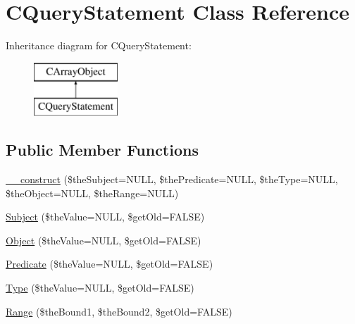 \hypertarget{class_c_query_statement}{\section{C\-Query\-Statement Class Reference}
\label{class_c_query_statement}
}
Inheritance diagram for C\-Query\-Statement\-:\begin{figure}[H]
\begin{center}
\leavevmode
\includegraphics[height=2.000000cm]{class_c_query_statement}
\end{center}
\end{figure}
\subsection*{Public Member Functions}
\begin{DoxyCompactItemize}
\item 
\hyperlink{class_c_query_statement_a996b7a9ae1d54bc3f73de41501b5e02b}{\-\_\-\-\_\-construct} (\$the\-Subject=N\-U\-L\-L, \$the\-Predicate=N\-U\-L\-L, \$the\-Type=N\-U\-L\-L, \$the\-Object=N\-U\-L\-L, \$the\-Range=N\-U\-L\-L)
\item 
\hyperlink{class_c_query_statement_a5a27c44c892286e2fc77dc961d2e30d4}{Subject} (\$the\-Value=N\-U\-L\-L, \$get\-Old=F\-A\-L\-S\-E)
\item 
\hyperlink{class_c_query_statement_ae941698661c8f4b94ce08ea1eaad94b7}{Object} (\$the\-Value=N\-U\-L\-L, \$get\-Old=F\-A\-L\-S\-E)
\item 
\hyperlink{class_c_query_statement_a4a6c6eca496b006e21bfd9c18a31f116}{Predicate} (\$the\-Value=N\-U\-L\-L, \$get\-Old=F\-A\-L\-S\-E)
\item 
\hyperlink{class_c_query_statement_a37bbaad291c18c92954cc25dd49c117b}{Type} (\$the\-Value=N\-U\-L\-L, \$get\-Old=F\-A\-L\-S\-E)
\item 
\hyperlink{class_c_query_statement_a17cf641a4180129015bc0da8e83a7a4c}{Range} (\$the\-Bound1, \$the\-Bound2, \$get\-Old=F\-A\-L\-S\-E)
\end{DoxyCompactItemize}
